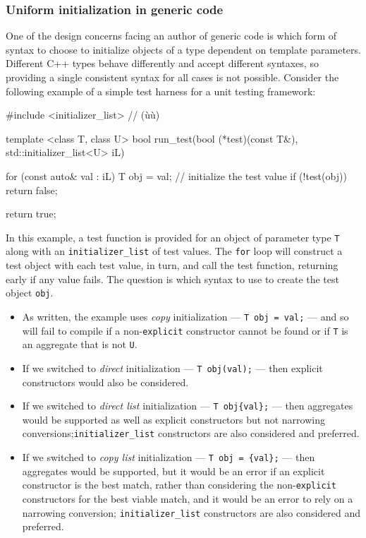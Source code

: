 \subsubsection[Uniform initialization in generic code]{Uniform initialization in generic code}\label{uniform-initialization-in-generic-code}

One of the design concerns facing an author of generic code is which
form of syntax to choose to initialize objects of a type dependent on
template parameters. Different C++ types behave differently and accept
different syntaxes, so providing a single consistent syntax for all
cases is not possible. Consider the following example of a simple test
harness for a unit testing framework:

\begin{emcppslisting}
#include <initializer_list>  // (ù{}ù)

template <class T, class U>
bool run_test(bool (*test)(const T&), std::initializer_list<U> iL)
{
    for (const auto& val : iL)
    {
        T obj = val;      // initialize the test value
        if (!test(obj))
        {
            return false;
        }
    }

    return true;
}
\end{emcppslisting}
    

\noindent In this example, a test function is provided for an object of parameter
type \lstinline!T! along with an \lstinline!initializer_list! of test values.
The \lstinline!for! loop will construct a test object with each test value,
in turn, and call the test function, returning early if any value fails.
The question is which syntax to use to create the test object
\lstinline!obj!.

\begin{itemize}
\item{As written, the example uses \emph{copy} initialization --- \lstinline!T!~\lstinline!obj!~\lstinline!=!~\lstinline!val;! --- and so will fail to compile if a non-\lstinline!explicit! constructor cannot be found or if \lstinline!T! is an aggregate that is not \lstinline!U!.}
\item{If we switched to \emph{direct} initialization --- \lstinline!T!~\lstinline!obj(val);! --- then explicit constructors would also be considered.}
\item{If we switched to \emph{direct list} initialization --- \lstinline!T!~\lstinline!obj{val};! --- then aggregates would be supported as well as explicit constructors but not narrowing conversions;\linebreak[4] \lstinline!initializer_list! constructors are also considered and preferred.}
\item{If we switched to \emph{copy list} initialization --- \lstinline!T!~\lstinline!obj!~\lstinline!=!~\lstinline!{val};! --- then aggregates would be supported, but it would be an error if an explicit constructor is the best match, rather than considering the non-\lstinline!explicit! constructors for the best viable match, and it would be an error to rely on a narrowing conversion; \lstinline!initializer_list! constructors are also considered and preferred.}
\end{itemize}

